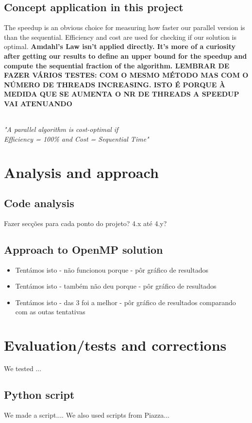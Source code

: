 \documentclass[10pt,journal,compsoc]{IEEEtran}
\begin{document}
\subsection{Concept application in this project}
The speedup is an obvious choice for measuring how faster our parallel version is than the sequential. Efficiency and cost are used for checking if our solution is optimal. \textbf{Amdahl's Law isn't applied directly. It's more of a curiosity after getting our results to define an upper bound for the speedup and compute the sequential fraction of the algorithm. LEMBRAR DE FAZER VÁRIOS TESTES: COM O MESMO MÉTODO MAS COM O NÚMERO DE THREADS INCREASING. ISTO É PORQUE À MEDIDA QUE SE AUMENTA O NR DE THREADS A SPEEDUP VAI ATENUANDO} 
\begin{center}
\textit{\\"A parallel algorithm is cost-optimal if\\ Efficiency = 100\% and Cost = Sequential Time"}
\end{center}

\section{Analysis and approach}

\subsection{Code analysis}
Fazer secções para cada ponto do projeto? 4.x até 4.y?

\subsection{Approach to OpenMP solution}
\begin{itemize}
    \item Tentámos isto - não funcionou porque - pôr gráfico de resultados
    \item Tentámos isto - também não deu porque - pôr gráfico de resultados
    \item Tentámos isto - das 3 foi a melhor - pôr gráfico de resultados comparando com as outas tentativas
\end{itemize}

\section{Evaluation/tests and corrections}
We tested ...

\subsection{Python script}
We made a script....
We also used scripts from Piazza...
\end{document}
